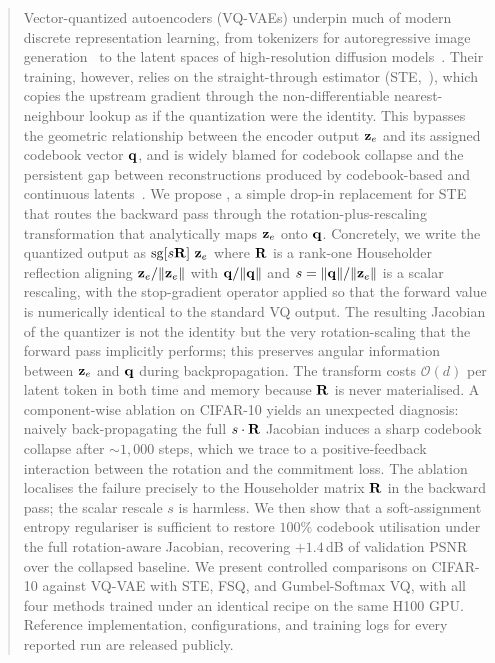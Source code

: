 \begin{abstract}
Vector-quantized autoencoders (VQ-VAEs) underpin much of modern discrete
representation learning, from tokenizers for autoregressive image
generation~\citep{esser2021vqgan,yu2022vitvqgan,sun2024llamagen} to the
latent spaces of high-resolution diffusion
models~\citep{rombach2022ldm}. Their training, however, relies on the
straight-through estimator
(STE,~\citealp{bengio2013ste,vandenoord2017vqvae}), which copies the
upstream gradient through the non-differentiable nearest-neighbour
lookup as if the quantization were the identity. This bypasses the
geometric relationship between the encoder output $\ze$ and its assigned
codebook vector $\qvec$, and is widely blamed for codebook collapse and
the persistent gap between reconstructions produced by codebook-based
and continuous
latents~\citep{huh2023straighteningste,mentzer2024fsq}. We propose
\ours{}, a simple drop-in replacement for STE that routes the backward
pass through the rotation-plus-rescaling transformation that
analytically maps $\ze$ onto $\qvec$. Concretely, we write the quantized
output as $\sg{s\rmat}\,\ze$ where $\rmat$ is a rank-one Householder
reflection aligning $\ze/\|\ze\|$ with $\qvec/\|\qvec\|$ and
$s=\|\qvec\|/\|\ze\|$ is a scalar rescaling, with the stop-gradient
operator applied so that the forward value is numerically identical to
the standard VQ output. The resulting Jacobian of the quantizer is not
the identity but the very rotation-scaling that the forward pass
implicitly performs; this preserves angular information between
$\ze$ and $\qvec$ during backpropagation. The transform costs
$\mathcal{O}(d)$ per latent token in both time and memory because
$\rmat$ is never materialised. A component-wise ablation on
CIFAR-10 yields an unexpected diagnosis: naively back-propagating
the full $s\cdot\rmat$ Jacobian induces a sharp codebook collapse
after $\sim\!1{,}000$ steps, which we trace to a positive-feedback
interaction between the rotation and the commitment loss. The
ablation localises the failure precisely to the Householder matrix
$\rmat$ in the backward pass; the scalar rescale $s$ is harmless.
We then show that a soft-assignment entropy regulariser is
sufficient to restore $100\%$ codebook utilisation under the full
rotation-aware Jacobian, recovering $+1.4$\,dB of validation PSNR
over the collapsed baseline. We present controlled comparisons on
CIFAR-10 against VQ-VAE with STE, FSQ, and Gumbel-Softmax VQ, with
all four methods trained under an identical recipe on the same
H100 GPU. Reference implementation, configurations, and training
logs for every reported run are released publicly.
\end{abstract}
